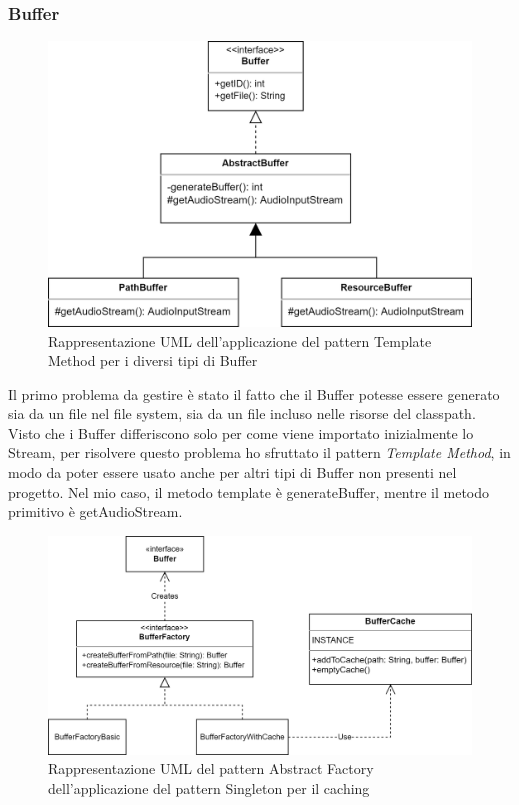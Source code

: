 \documentclass[a4paper,12pt]{report}
\begin{document}
\subsubsection*{Buffer}
\begin{figure}[H]
\centering{}
\includegraphics[width=\textwidth]{img/buffer/Buffer.png}
\caption{Rappresentazione UML dell’applicazione del pattern Template Method per i diversi tipi di Buffer}
\label{img:templatebuffer}
\end{figure}
Il primo problema da gestire è stato il fatto che il Buffer potesse essere generato sia da un file nel file system, sia da un file incluso nelle risorse del classpath. Visto che i Buffer differiscono solo per come viene importato inizialmente lo Stream, per risolvere questo problema ho sfruttato il pattern \textit{Template Method}, in modo da poter essere usato anche per altri tipi di Buffer non presenti nel progetto. Nel mio caso, il metodo template è generateBuffer, mentre il metodo primitivo è getAudioStream.
%
\begin{figure}[H]
\centering{}
\includegraphics[width=\textwidth]{img/buffer/BufferFactory.png}
\caption{Rappresentazione UML del pattern Abstract Factory dell’applicazione del pattern Singleton per il caching}
\label{img:factory}
\end{figure}
\end{document}
